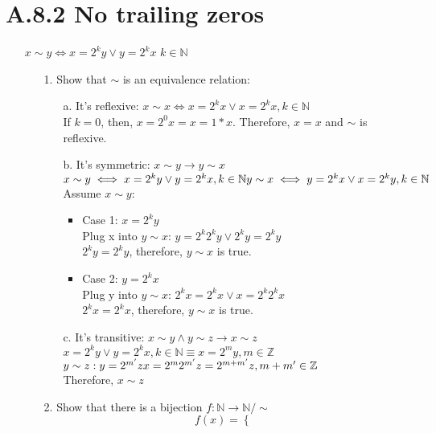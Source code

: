 \documentclass[12pt]{article}
\begin{document}
\section*{A.8.2 No trailing zeros}
\begin{enumerate}
  \item[] $x\sim y \iff x = 2^ky \vee y = 2^kx$ $k\in \mathbb{N}$
    \begin{enumerate}
      \item[1.] Show that $\sim$ is an equivalence relation:
        \begin{enumerate}
          \item[a.] It's reflexive: $x\sim x \iff x=2^kx\vee x=2^kx, k\in\mathbb{N}$
            \\ If $k=0$, then, $x=2^0x = x=1*x$. Therefore, $x=x$ and $\sim$ is reflexive.
          \item[b.] It's symmetric: $x\sim y \rightarrow y\sim x$
            \\ $x\sim y \iff x = 2^ky \vee y= 2^kx, k\in\mathbb{N}
            \\ y\sim x \iff y = 2^kx \vee x=2^ky, k\in\mathbb{N}$
            Assume $x\sim y$: 
            \begin{itemize}
              \item Case 1: $x=2^ky$
                \\Plug x into $y\sim x$: $y=2^k2^ky \vee 2^ky = 2^ky$
                \\$2^ky = 2^ky$, therefore, $y\sim x$ is true.
              \item Case 2: $y=2^kx$
                \\Plug y into $y\sim x$: $2^kx = 2^kx\vee x = 2^k2^kx$
                \\$2^kx = 2^kx$, therefore, $y\sim x$ is true.
            \end{itemize}
          \item[c.] It's transitive: $x\sim y \wedge y\sim z \rightarrow x\sim z$
            \\ $x=2^ky \vee y=2^kx, k\in\mathbb{N}\equiv x=2^my, m\in\mathbb{Z}$
            \\$y\sim z: y=2^{m'}z
            \\ x = 2^m2^{m'}z=2^{m+m'}z, m+m'\in\mathbb{Z}$
            \\ Therefore, $x\sim z$
        \end{enumerate}
      \item[2.] Show that there is a bijection $f : \mathbb{N}\rightarrow\mathbb{N}/\sim$
        \[ f(x) = \begin{cases} 

\end{cases}\]
\end{enumerate}
\end{enumerate}
\end{document}
